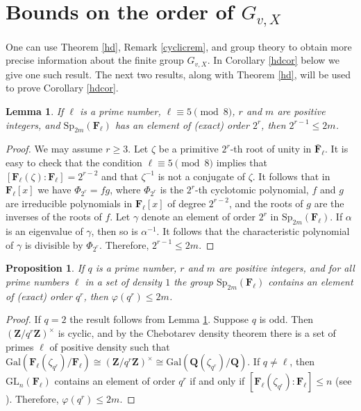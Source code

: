 \documentclass{amsart}
\def\Q{{\mathbf Q}}
\def\Z{{\mathbf Z}}
\def\F{{\mathbf F}}
\def\Gal{\mathrm{Gal}}
\def\GL{\mathrm{GL}}
\def\Sp{\mathrm{Sp}}
\newtheorem{lem}[thm]{Lemma}
\newtheorem{prop}[thm]{Proposition}
\theoremstyle{definition}
\begin{document}
\section{Bounds on the order of $G_{v,X}$}
\label{order}

One can use Theorem \ref{hd}, Remark \ref{cyclicrem}, and 
group theory to obtain more precise information about the
finite group $G_{v,X}$. In Corollary \ref{hdcor} below we
give one such result.
The next two results, along with Theorem \ref{hd}, 
will be used to prove Corollary \ref{hdcor}.

\begin{lem}
\label{2bd}
If $\ell$ is a prime number, $\ell \equiv 5 \pmod{8}$, 
$r$ and $m$ are positive integers, and 
$\Sp_{2m}(\F_{\ell})$ has an element of (exact) order $2^{r}$,
then $2^{r-1} \le 2m$.
\end{lem}

\begin{proof}
We may assume $r \ge 3$. 
Let $\zeta$ be a primitive $2^{r}$-th root of unity in 
${\bar \F_{\ell}}$. It is easy to check that the condition 
$\ell \equiv 5 \pmod{8}$ implies that 
$[\F_{\ell}(\zeta):\F_{\ell}] = 2^{r-2}$
and that $\zeta^{-1}$ is not a conjugate of $\zeta$.
It follows that in $\F_{\ell}[x]$ we have
$\Phi_{2^{r}} = fg$, where $\Phi_{2^{r}}$ is the $2^{r}$-th
cyclotomic polynomial, $f$ and $g$ are irreducible polynomials
in $\F_{\ell}[x]$ of degree $2^{r-2}$, and the roots of $g$ are
the inverses of the roots of $f$.
Let $\gamma$ denote an element of order $2^{r}$ in 
$\Sp_{2m}(\F_{\ell})$. If $\alpha$ is an eigenvalue of $\gamma$,
then so is $\alpha^{-1}$. It follows that the characteristic
polynomial of $\gamma$ is divisible by $\Phi_{2^{r}}$.
Therefore, $2^{r-1} \le 2m$.
\end{proof}

\begin{prop}
\label{qbd}
If $q$ is a prime number, $r$ and $m$ are positive integers,
and for all prime numbers $\ell$ in a set of density $1$
the group $\Sp_{2m}(\F_{\ell})$ contains an element of (exact) 
order $q^{r}$,
then $\varphi(q^{r}) \le 2m$.
\end{prop}

\begin{proof}
If $q = 2$ the result follows from Lemma \ref{2bd}.
Suppose $q$ is odd. Then $(\Z/q^{r}\Z)^{\times}$ is cyclic, and by
the Chebotarev density theorem there is a set of primes $\ell$
of positive density such that 
$\Gal(\F_{\ell}(\zeta_{q^{r}})/\F_{\ell}) \cong
(\Z/q^{r}\Z)^{\times} \cong
\Gal(\Q(\zeta_{q^{r}})/\Q)$.
If $q \ne \ell$, then
$\GL_{n}(\F_{\ell})$ contains an element of order $q^{r}$
if and only if $[\F_{\ell}(\zeta_{q^{r}}):\F_{\ell}] \le n$
(see \cite{Volvacev}).
Therefore, $\varphi(q^{r}) \le 2m$.
\end{proof}
\end{document}
